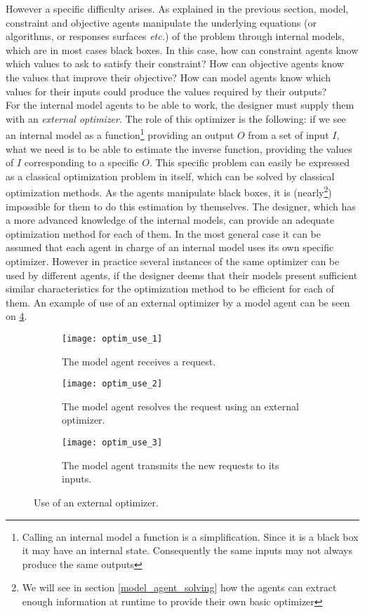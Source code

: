 However a specific difficulty arises. As explained in the previous section, model, constraint and objective agents manipulate the underlying equations (or algorithms, or responses surfaces \emph{etc.}) of the problem through internal models, which are in most cases black boxes. In this case, how can constraint agents know which values to ask to satisfy their constraint? How can objective agents know the values that improve their objective? How can model agents know which values for their inputs could produce the values required by their outputs?\\
For the internal model agents to be able to work, the designer must supply them with an \emph{external optimizer}. The role of this optimizer is the following: if we see an internal model as a function\footnote{Calling an internal model a function is a simplification. Since it is a black box it may have an internal state. Consequently the same inputs may not always produce the same outputs} providing an output $O$ from a set of input $I$, what we need is to be able to estimate the inverse function, providing the values of $I$ corresponding to a specific $O$. This specific problem can easily be expressed as a classical optimization problem in itself, which can be solved by classical optimization methods. As the agents manipulate black boxes, it is (nearly\footnote{We will see in section \ref{model_agent_solving} how the agents can extract enough information at runtime to provide their own basic optimizer}) impossible for them to do this estimation by themselves. The designer, which has a more advanced knowledge of the internal models, can provide an adequate optimization method for each of them. In the most general case it can be assumed that each agent in charge of an internal model uses its own specific optimizer. However in practice several instances of the same optimizer can be used by different agents, if the designer deems that their models present sufficient similar characteristics for the optimization method to be efficient for each of them. An example of use of an external optimizer by a model agent can be seen on \figurename{} \ref{optim_use}.

\begin{figure}
	\centering
	\begin{subfigure}[b]{0.32\textwidth}
		\centering
		\texttt{[image: optim\_use\_1]}
		\caption{The model agent receives a request.}\label{optim_use:1}
	\end{subfigure}
	\hfill
	\begin{subfigure}[b]{0.32\textwidth}
		\centering
		\texttt{[image: optim\_use\_2]}
		\caption{The model agent resolves the request using an external optimizer.}\label{optim_use:2}
	\end{subfigure}
	\hfill
	\begin{subfigure}[b]{0.32\textwidth}
		\centering
		\texttt{[image: optim\_use\_3]}
		\caption{The model agent transmits the new requests to its inputs.}\label{optim_use:3}
	\end{subfigure}
	\caption{Use of an external optimizer.}\label{optim_use}
\end{figure}

